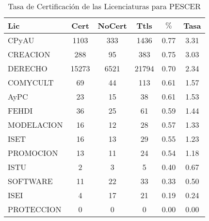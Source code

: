 \documentclass[12pt]{article}
\begin{document}
\begin{table}[h]
\centering
\begin{tabular}{|l|cc|c|cc|}\hline
Lic & Cert & NoCert & Ttls & $\%$ & Tasa \\\hline
CPyAU & 1103 & 333 & 1436 & 0.77 & 3.31 \\
CREACION & 288 & 95 & 383 & 0.75 & 3.03 \\\hline\hline
DERECHO & 15273 & 6521 & 21794 & 0.70 & 2.34 \\\hline\hline
COMYCULT & 69 & 44 & 113 & 0.61 & 1.57 \\
AyPC & 23 & 15 & 38 & 0.61 & 1.53 \\\hline\hline
FEHDI & 36 & 25 & 61 & 0.59 & 1.44 \\
MODELACION & 16 & 12 & 28 & 0.57 & 1.33 \\
ISET & 16 & 13 & 29 & 0.55 & 1.23 \\
PROMOCION & 13 & 11 & 24 & 0.54 & 1.18 \\\hline\hline
ISTU & 2 & 3 & 5 & 0.40 & 0.67 \\
SOFTWARE & 11 & 22 & 33 & 0.33 & 0.50 \\\hline\hline
ISEI & 4 & 17 & 21 & 0.19 & 0.24 \\
PROTECCION & 0 & 0 & 0 & 0.00 & 0.00 \\\hline\hline

\end{tabular}
\caption{Tasa de Certificación de las Licenciaturas para PESCER}
\end{table}
\end{document}
